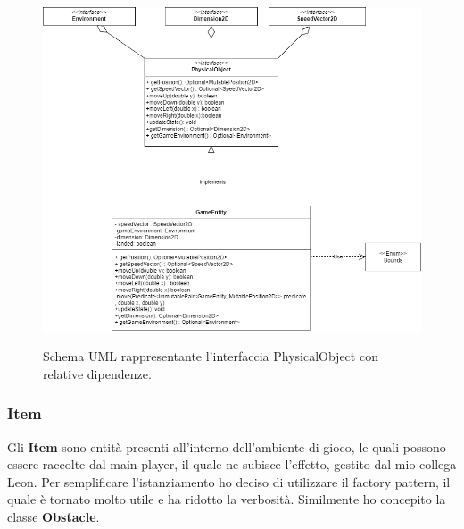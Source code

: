 \begin{figure}[H]
	\centering{}
	\includegraphics[width=320pt]{img/physicalObject}
	\label{img:physicalObject}
	\caption{Schema UML rappresentante l'interfaccia PhysicalObject con relative dipendenze. \\}
\end{figure}

\newpage

\subsubsection{Item}
Gli \textbf{Item} sono entità presenti all'interno dell'ambiente di gioco, le quali possono essere raccolte dal main player, il quale ne subisce l'effetto, gestito dal mio collega Leon.
Per semplificare l'istanziamento ho deciso di utilizzare il factory pattern, il quale è tornato molto utile e ha ridotto la verbosità. Similmente ho concepito la classe \textbf{Obstacle}.

